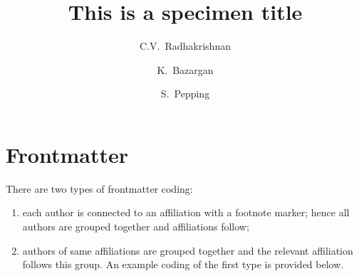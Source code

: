 \documentclass[a4paper,12pt]{article}
\begin{document}
\section{Frontmatter}

There are two types of frontmatter coding:
\begin{enumerate}[(1)]
\item each author is
connected to an affiliation with a footnote marker; hence all
authors are grouped together and affiliations follow;
\item authors of same affiliations are grouped together and the
relevant affiliation follows this group. An example coding of the first
type is provided below.
\end{enumerate}

\begin{vquote}
 \title{This is a specimen title}
\end{vquote}

\begin{vquote}
 \author[rvt]{C.V.~Radhakrishnan}

 \author[rvt,focal]{K.~Bazargan}

 \author[els]{S.~Pepping}
\end{vquote}

\begin{vquote}

 \address[rvt]{River Valley Technologies, SJP Building,
    Cotton Hills, Trivandrum, Kerala, India 695014}
 \address[focal]{River Valley Technologies, 9, Browns Court,
    Kennford, Exeter, United Kingdom}
 \address[els]{Central Application Management,
    Elsevier, Radarweg 29, 1043 NX\\
    Amsterdam, Netherlands}

\end{vquote}
\end{document}
